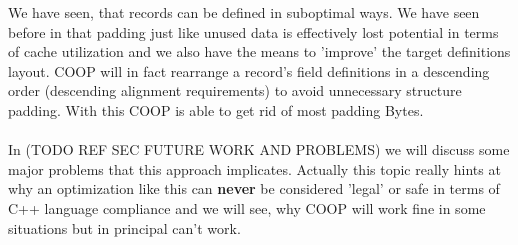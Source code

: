 We have seen, that records can be defined in suboptimal ways. We have seen before in  that padding just like unused data is effectively lost potential in terms of cache utilization and we also have the means to 'improve' the target definitions layout. COOP will in fact rearrange a record's field definitions in a descending order (descending alignment requirements) to avoid unnecessary structure padding. With this COOP is able to get rid of most padding Bytes.\\\\
In  (TODO REF SEC FUTURE WORK AND PROBLEMS) we will discuss some major problems that this approach implicates. Actually this topic really hints at why an optimization like this can \textbf{never} be considered 'legal' or safe in terms of C++ language compliance and we will see, why COOP will work fine in some situations but in principal can't work.




